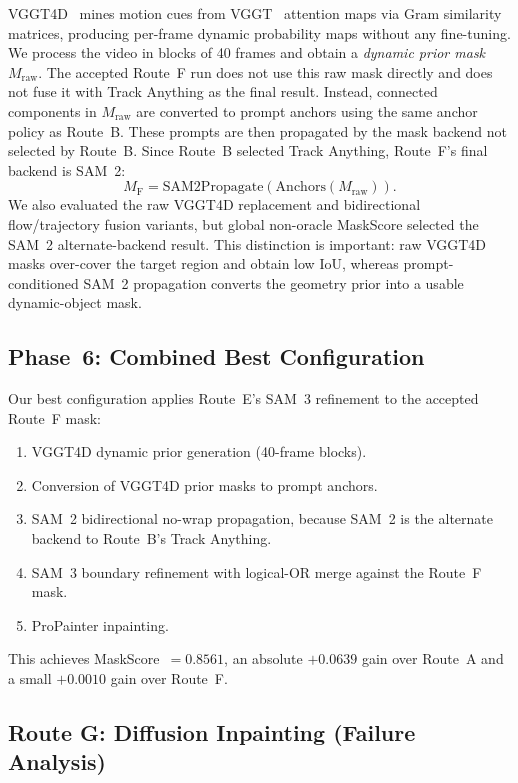 VGGT4D~\cite{vggt4d} mines motion cues from VGGT~\cite{vggt} attention maps via
Gram similarity matrices, producing per-frame dynamic probability maps without
any fine-tuning. We process the video in blocks of 40 frames and obtain a
\emph{dynamic prior mask} $M_{\text{raw}}$. The accepted Route~F run does not use this
raw mask directly and does not fuse it with Track Anything as the final result. Instead,
connected components in $M_{\text{raw}}$ are converted to prompt anchors using the same
anchor policy as Route~B. These prompts are then propagated by the mask backend not
selected by Route~B. Since Route~B selected Track Anything, Route~F's final backend is
SAM~2:
\begin{equation}
  M_{\text{F}} = \mathrm{SAM2Propagate}(
  \mathrm{Anchors}(M_{\text{raw}})).
  \label{eq:vggt_prompt}
\end{equation}
We also evaluated the raw VGGT4D replacement and bidirectional flow/trajectory fusion
variants, but global non-oracle MaskScore selected the SAM~2 alternate-backend result.
This distinction is important: raw VGGT4D masks over-cover the target region and obtain
low IoU, whereas prompt-conditioned SAM~2 propagation converts the geometry prior into a
usable dynamic-object mask.

\subsection{Phase~6: Combined Best Configuration}
\label{sec:method:phase6}

Our best configuration applies Route~E's SAM~3 refinement to the accepted Route~F mask:
\begin{enumerate}
  \item VGGT4D dynamic prior generation (40-frame blocks).
  \item Conversion of VGGT4D prior masks to prompt anchors.
  \item SAM~2 bidirectional no-wrap propagation, because SAM~2 is the alternate backend to Route~B's Track Anything.
  \item SAM~3 boundary refinement with logical-OR merge against the Route~F mask.
  \item ProPainter inpainting.
\end{enumerate}
This achieves MaskScore~$=0.8561$, an absolute $+0.0639$ gain over Route~A and a small
$+0.0010$ gain over Route~F.

\subsection{Route G: Diffusion Inpainting (Failure Analysis)}
\label{sec:method:g}

